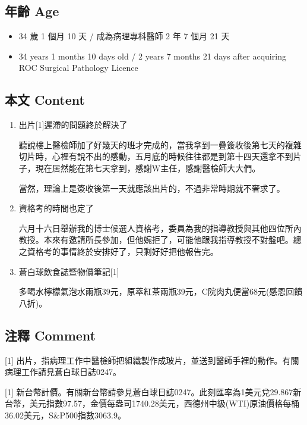 \documentclass[
]{article}
\providecommand{\tightlist}{%
  \setlength{\itemsep}{0pt}\setlength{\parskip}{0pt}}
\begin{document}
\hypertarget{ux5e74ux9f61-age-1}{%
\subsection{年齡 Age}\label{ux5e74ux9f61-age-1}}

\begin{itemize}
\tightlist
\item
  34 歲 1 個月 10 天 / 成為病理專科醫師 2 年 7 個月 21 天
\item
  34 years 1 months 10 days old / 2 years 7 months 21 days after
  acquiring ROC Surgical Pathology Licence
\end{itemize}

\hypertarget{ux672cux6587-content-1}{%
\subsection{本文 Content}\label{ux672cux6587-content-1}}

\begin{enumerate}
\def\labelenumi{\arabic{enumi}.}
\item
  出片{[}1{]}遲滯的問題終於解決了

  聽說樓上醫檢師加了好幾天的班才完成的，當我拿到一疊簽收後第七天的複雜切片時，心裡有說不出的感動，五月底的時候往往都是到第十四天還拿不到片子，現在居然能在第七天拿到，感謝W主任，感謝醫檢師大大們。

  當然，理論上是簽收後第一天就應該出片的，不過非常時期就不奢求了。
\item
  資格考的時間也定了

  六月十六日舉辦我的博士候選人資格考，委員為我的指導教授與其他四位所內教授。本來有邀請所長參加，但他婉拒了，可能他跟我指導教授不對盤吧。總之資格考的事情終於安排好了，只剩好好把他報告完。
\item
  蒼白球飲食誌暨物價筆記{[}1{]}

  多喝水檸檬氣泡水兩瓶39元，原萃紅茶兩瓶39元，C院肉丸便當68元(感恩回饋八折)。
\end{enumerate}

\hypertarget{ux6ce8ux91cb-comment-1}{%
\subsection{注釋 Comment}\label{ux6ce8ux91cb-comment-1}}

{[}1{]}
出片，指病理工作中醫檢師把組織製作成玻片，並送到醫師手裡的動作。有關病理工作請見蒼白球日誌0247。

{[}1{]}
新台幣計價。有關新台幣請參見蒼白球日誌0247。此刻匯率為1美元兌29.867新台幣，美元指數97.57，金價每盎司1740.28美元，西德州中級(WTI)原油價格每桶36.02美元，S\&P500指數3063.9。
\end{document}
